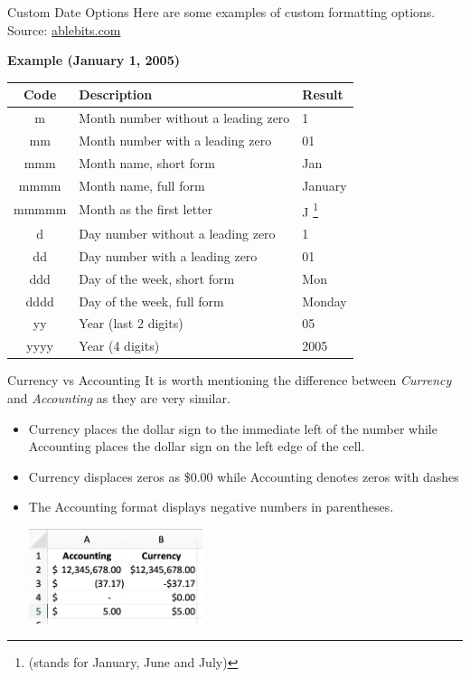 \documentclass[xcolor=svgnames]{beamer}
\begin{document}
\begin{frame}{Custom Date Options}
Here are some examples of custom formatting options. Source: \href{https://www.ablebits.com/office-addins-blog/2015/03/11/change-date-format-excel/\#custom-date-format}{ablebits.com}
\begin{center}
{\bf Example (January 1, 2005)} 
\begin{tabular}{|c|l|l|}
\hline
{\bf Code} & {\bf	Description} & 	{\bf Result}\\
\hline
m	& Month number without a leading zero&	1\\
mm	& Month number with a leading zero	& 01\\
mmm	& Month name, short form	 & Jan\\
mmmm	& Month name, full form& 	January\\
mmmmm &	Month as the first letter	& J \footnote{(stands for January, June and July)}\\
d &	Day number without a leading zero&	1\\
dd&	Day number with a leading zero&	01\\
ddd	&Day of the week, short form&	Mon\\
dddd&	Day of the week, full form	& Monday\\
yy&	Year (last 2 digits)&	05\\
yyyy&	Year (4 digits)	&2005\\
\hline\end{tabular}
\end{center}
\end{frame}





\begin{frame}{Currency vs Accounting}
It is worth mentioning the difference between \textit{Currency} and \textit{Accounting} as they are very similar.
\begin{itemize} 
\item Currency places the dollar sign to the immediate left of the number while Accounting places the dollar sign on the left edge of the cell.
\item Currency displaces zeros as \$0.00 while Accounting denotes zeros with dashes
\item The Accounting format displays negative numbers in parentheses.
\begin{center}
 \includegraphics[width=0.4\textwidth]{currencyVsAccounting}
\end{center}                                         
\end{itemize}
\end{frame}
\end{document}
